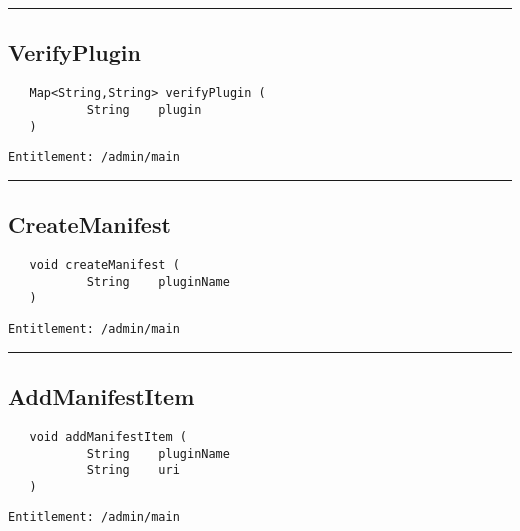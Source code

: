 \rule{12cm}{2pt}
\subsection{VerifyPlugin}
\label{Api:VerifyPlugin}
\begin{verbatim}
   Map<String,String> verifyPlugin (
           String    plugin
   )
\end{verbatim}
\begin{Verbatim}[fontsize=\small, formatcom=\color{Maroon}]
  Entitlement: /admin/main
\end{Verbatim}



\rule{12cm}{2pt}
\subsection{CreateManifest}
\label{Api:CreateManifest}
\begin{verbatim}
   void createManifest (
           String    pluginName
   )
\end{verbatim}
\begin{Verbatim}[fontsize=\small, formatcom=\color{Maroon}]
  Entitlement: /admin/main
\end{Verbatim}



\rule{12cm}{2pt}
\subsection{AddManifestItem}
\label{Api:AddManifestItem}
\begin{verbatim}
   void addManifestItem (
           String    pluginName
           String    uri
   )
\end{verbatim}
\begin{Verbatim}[fontsize=\small, formatcom=\color{Maroon}]
  Entitlement: /admin/main
\end{Verbatim}



